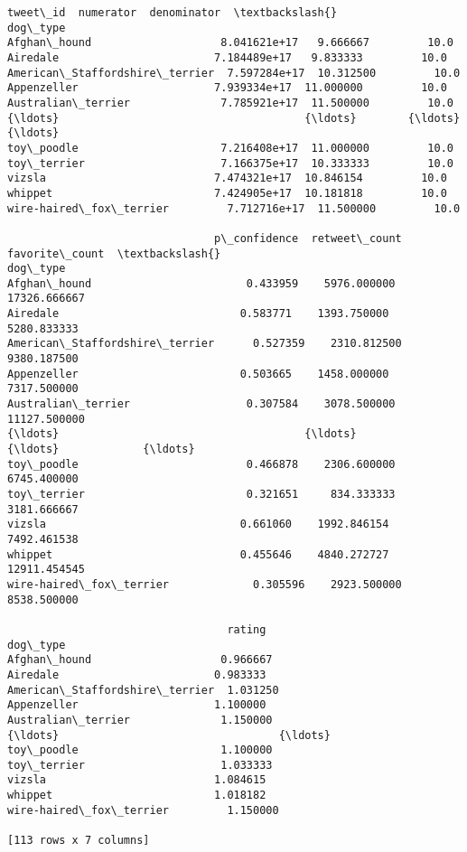 \documentclass[11pt]{article}
\makeatletter
\newcommand{\boxspacing}{\kern\kvtcb@left@rule\kern\kvtcb@boxsep}
\newcommand{\prompt}[4]{
        {\ttfamily\llap{{\color{#2}[#3]:\hspace{3pt}#4}}\vspace{-\baselineskip}}
    }
\makeatother
\begin{document}
            \begin{tcolorbox}[breakable, size=fbox, boxrule=.5pt, pad at break*=1mm, opacityfill=0]
\prompt{Out}{outcolor}{85}{\boxspacing}
\begin{Verbatim}[commandchars=\\\{\}]
                                    tweet\_id  numerator  denominator  \textbackslash{}
dog\_type
Afghan\_hound                    8.041621e+17   9.666667         10.0
Airedale                        7.184489e+17   9.833333         10.0
American\_Staffordshire\_terrier  7.597284e+17  10.312500         10.0
Appenzeller                     7.939334e+17  11.000000         10.0
Australian\_terrier              7.785921e+17  11.500000         10.0
{\ldots}                                      {\ldots}        {\ldots}          {\ldots}
toy\_poodle                      7.216408e+17  11.000000         10.0
toy\_terrier                     7.166375e+17  10.333333         10.0
vizsla                          7.474321e+17  10.846154         10.0
whippet                         7.424905e+17  10.181818         10.0
wire-haired\_fox\_terrier         7.712716e+17  11.500000         10.0

                                p\_confidence  retweet\_count  favorite\_count  \textbackslash{}
dog\_type
Afghan\_hound                        0.433959    5976.000000    17326.666667
Airedale                            0.583771    1393.750000     5280.833333
American\_Staffordshire\_terrier      0.527359    2310.812500     9380.187500
Appenzeller                         0.503665    1458.000000     7317.500000
Australian\_terrier                  0.307584    3078.500000    11127.500000
{\ldots}                                      {\ldots}            {\ldots}             {\ldots}
toy\_poodle                          0.466878    2306.600000     6745.400000
toy\_terrier                         0.321651     834.333333     3181.666667
vizsla                              0.661060    1992.846154     7492.461538
whippet                             0.455646    4840.272727    12911.454545
wire-haired\_fox\_terrier             0.305596    2923.500000     8538.500000

                                  rating
dog\_type
Afghan\_hound                    0.966667
Airedale                        0.983333
American\_Staffordshire\_terrier  1.031250
Appenzeller                     1.100000
Australian\_terrier              1.150000
{\ldots}                                  {\ldots}
toy\_poodle                      1.100000
toy\_terrier                     1.033333
vizsla                          1.084615
whippet                         1.018182
wire-haired\_fox\_terrier         1.150000

[113 rows x 7 columns]
\end{Verbatim}
\end{tcolorbox}
        
\end{document}

